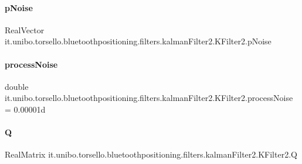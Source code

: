 \paragraph{\texorpdfstring{p\+Noise}{pNoise}}
{\footnotesize\ttfamily Real\+Vector it.\+unibo.\+torsello.\+bluetoothpositioning.\+filters.\+kalman\+Filter2.\+K\+Filter2.\+p\+Noise\hspace{0.3cm}{\ttfamily [private]}}

\hypertarget{classit_1_1unibo_1_1torsello_1_1bluetoothpositioning_1_1filters_1_1kalmanFilter2_1_1KFilter2_aa134d4ebc0ce26d332937a66641188b2_aa134d4ebc0ce26d332937a66641188b2}{}\label{classit_1_1unibo_1_1torsello_1_1bluetoothpositioning_1_1filters_1_1kalmanFilter2_1_1KFilter2_aa134d4ebc0ce26d332937a66641188b2_aa134d4ebc0ce26d332937a66641188b2} 
\paragraph{\texorpdfstring{process\+Noise}{processNoise}}
{\footnotesize\ttfamily double it.\+unibo.\+torsello.\+bluetoothpositioning.\+filters.\+kalman\+Filter2.\+K\+Filter2.\+process\+Noise = 0.\+00001d\hspace{0.3cm}{\ttfamily [private]}}

\hypertarget{classit_1_1unibo_1_1torsello_1_1bluetoothpositioning_1_1filters_1_1kalmanFilter2_1_1KFilter2_a5eb690def3c277c815619aa2363abd74_a5eb690def3c277c815619aa2363abd74}{}\label{classit_1_1unibo_1_1torsello_1_1bluetoothpositioning_1_1filters_1_1kalmanFilter2_1_1KFilter2_a5eb690def3c277c815619aa2363abd74_a5eb690def3c277c815619aa2363abd74} 
\paragraph{\texorpdfstring{Q}{Q}}
{\footnotesize\ttfamily Real\+Matrix it.\+unibo.\+torsello.\+bluetoothpositioning.\+filters.\+kalman\+Filter2.\+K\+Filter2.\+Q\hspace{0.3cm}{\ttfamily [private]}}

